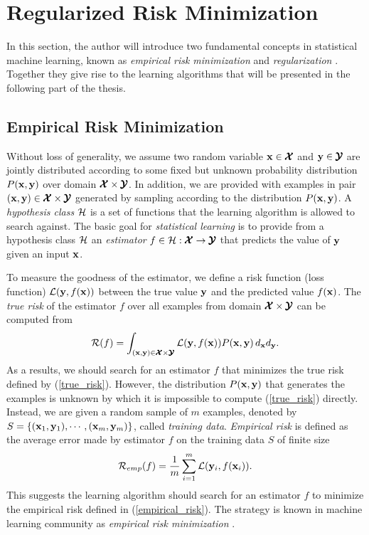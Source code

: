 %
\section{Regularized Risk Minimization}\label{sc_rrm}

In this section, the author will introduce two fundamental concepts in statistical machine learning, known as \textit{empirical risk minimization} \citep{Vapnik92principles} and \textit{regularization} \citep{Evgeniou99a} .
Together they give rise to the learning algorithms that will be presented in the following part of the thesis.

\subsection{Empirical Risk Minimization}\label{sc_erm}

Without loss of generality, we assume two random variable $\mathbf {x}\in\pmb {\mathcal{X}}$ and $\mathbf {y}\in\pmb {\mathcal{Y}}$ are jointly distributed according to some fixed but unknown probability distribution $P(\mathbf {x},\mathbf {y})$ over domain $\pmb {\mathcal{X}}\times\pmb {\mathcal{Y}}$.
In addition, we are provided with examples in pair $(\mathbf {x},\mathbf {y})\in\pmb {\mathcal{X}}\times\pmb {\mathcal{Y}}$ generated by sampling according to the distribution $P(\mathbf {x},\mathbf {y})$.
A \textit{hypothesis class} $\mathcal{H}$ is a set of functions that the learning algorithm is allowed to search against.
The basic goal for \textit{statistical learning} is to provide from a hypothesis class $\mathcal{H}$ an \textit{estimator} $f\in\mathcal{H}:\pmb {\mathcal{X}}\rightarrow\pmb {\mathcal{Y}}$ that predicts the value of $\mathbf {y}$ given an input $\mathbf {x}$.

To measure the goodness of the estimator, we define a risk function (loss function) $\mathcal{L}(\mathbf {y},f(\mathbf {x}))$ between the true value $\mathbf {y}$ and the predicted value $f(\mathbf {x})$.
The \textit{true risk} of the estimator $f$ over all examples from domain $\pmb {\mathcal{X}}\times\pmb {\mathcal{Y}}$ can be computed from
\begin{align}
	\mathcal{R}(f) = \int_{(\mathbf {x},\mathbf {y})\in\pmb {\mathcal{X}}\times\pmb {\mathcal{Y}}}\mathcal{L}(\mathbf {y},f(\mathbf {x}))P(\mathbf {x},\mathbf {y})\,d_{\mathbf {x}}d_{\mathbf {y}} \label{true_risk}.
\end{align}
As a results, we should search for an estimator $f$ that minimizes the true risk defined by (\ref{true_risk}).
However, the distribution $P(\mathbf {x},\mathbf {y})$ that generates the examples is unknown by which it is impossible to compute (\ref{true_risk}) directly.
Instead, we are given a random sample of $m$ examples, denoted by $S=\{(\mathbf {x}_1,\mathbf {y}_1),\cdots,(\mathbf {x}_m,\mathbf {y}_m)\}$, called \textit{training data}.
\textit{Empirical risk} is defined as the average error made by estimator $f$ on the training data $S$ of finite size
\begin{align}
	\mathcal{R}_{emp}(f) = \frac{1}{m}\sum_{i=1}^{m}\mathcal{L}(\mathbf {y}_i,f(\mathbf {x}_i)) \label{empirical_risk}.
\end{align}
This suggests the learning algorithm should search for an estimator $f$ to minimize the empirical risk defined in (\ref{empirical_risk}).
The strategy is known in machine learning community as \textit{empirical risk minimization} \citep{Vapnik92principles}.

